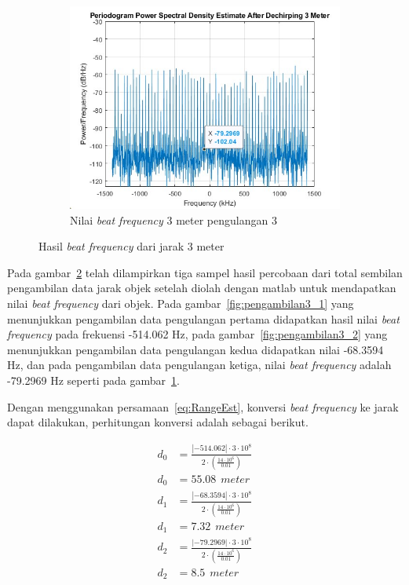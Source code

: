\begin{figure}
    \begin{subfigure}[b]{0.6\textwidth}
        \centering
        \includegraphics[scale=0.35]{pics/bab5/Range/3_3.jpg}
        \caption{Nilai \textit{beat frequency} 3 meter pengulangan 3}
        \label{fig:pengambilan3_3}
    \end{subfigure}
    \caption{Hasil \textit{beat frequency} dari jarak 3 meter}
    \label{fig:pengambilan3}
\end{figure}

Pada gambar~\ref{fig:pengambilan3} telah dilampirkan tiga sampel hasil percobaan dari total sembilan pengambilan data jarak objek setelah diolah dengan matlab untuk mendapatkan nilai \textit{beat frequency} dari objek. Pada gambar~\ref{fig:pengambilan3_1} yang menunjukkan pengambilan data pengulangan pertama didapatkan hasil nilai \textit{beat frequency} pada frekuensi -514.062 Hz, pada gambar~\ref{fig:pengambilan3_2} yang menunjukkan pengambilan data pengulangan kedua didapatkan nilai -68.3594 Hz, dan pada pengambilan data pengulangan ketiga, nilai \textit{beat frequency} adalah -79.2969 Hz seperti pada gambar~\ref{fig:pengambilan3_3}.

Dengan menggunakan persamaan~\ref{eq:RangeEst}, konversi \textit{beat frequency} ke jarak dapat dilakukan, perhitungan konversi adalah sebagai berikut.

\begin{align*}
    d_{0} &= \frac{|-514.062| \cdot 3 \cdot 10^{8}}{2 \cdot (\frac{14 \cdot 10^{6}}{0.01})}\\
   d_{0} &= 55.08 \phantom{b} meter\\
   d_{1} &= \frac{|-68.3594| \cdot 3 \cdot 10^{8}}{2 \cdot (\frac{14 \cdot 10^{6}}{0.01})}\\
   d_{1} &= 7.32 \phantom{b} meter\\
   d_{2} &= \frac{|-79.2969| \cdot 3 \cdot 10^{8}}{2 \cdot (\frac{14 \cdot 10^{6}}{0.01})}\\
   d_{2} &= 8.5 \phantom{b} meter\\
\end{align*}

